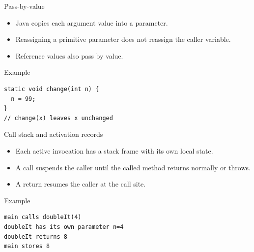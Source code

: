 \documentclass[10pt,aspectratio=169]{beamer}
\begin{document}
\begin{frame}[fragile,t]{Pass-by-value}
\begin{itemize}
\item Java copies each argument value into a parameter.
\item Reassigning a primitive parameter does not reassign the caller variable.
\item Reference values also pass by value.
\end{itemize}
\vspace{1mm}\begin{block}{Example}
\begin{lstlisting}
static void change(int n) {
  n = 99;
}
// change(x) leaves x unchanged
\end{lstlisting}
\end{block}
\end{frame}

\begin{frame}[fragile,t]{Call stack and activation records}
\begin{itemize}
\item Each active invocation has a stack frame with its own local state.
\item A call suspends the caller until the called method returns normally or throws.
\item A return resumes the caller at the call site.
\end{itemize}
\vspace{1mm}\begin{block}{Example}
\begin{lstlisting}
main calls doubleIt(4)
doubleIt has its own parameter n=4
doubleIt returns 8
main stores 8
\end{lstlisting}
\end{block}
\end{frame}
\end{document}
